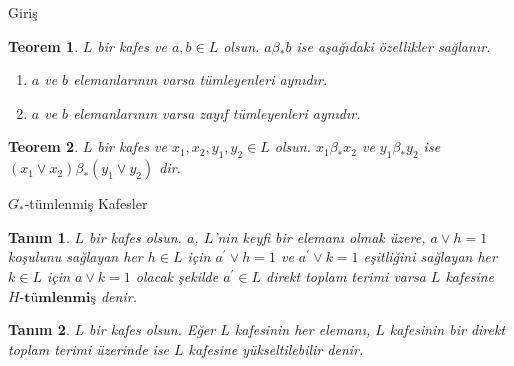 \documentclass[mathserif]{beamer}
\newtheorem*{teorem}{Teorem}
\newtheorem*{tanim}{Tanım}
\begin{document}
\begin{frame}{Giriş}
\begin{teorem}
    $ L $ bir kafes ve $ a,b \in L $ olsun. $ a \beta_* b $ ise aşağıdaki özellikler sağlanır.
    \begin{enumerate}
      \item $ a $ ve $ b $ elemanlarının varsa tümleyenleri aynıdır.
      \item $ a $ ve $ b $ elemanlarının varsa zayıf tümleyenleri aynıdır.
    \end{enumerate}
\end{teorem}
\begin{teorem}
  $ L $ bir kafes ve $ x_1, x_2,y_1,y_2 \in L $ olsun. $ x_1 \beta_* x_2 $ ve $ y_1 \beta_* y_2 $ ise 
  $ ( x_1 \vee x_2 ) \beta_* ( y_1 \vee y_2 ) $ dir.
\end{teorem}
\end{frame}














\begin{frame}{$ G_* $-tümlenmiş Kafesler}
  \begin{tanim}
    $ L $ bir kafes olsun. $ a $, $ L $'nin keyfi bir elemanı olmak üzere,
    $ a \vee h = 1 $ koşulunu sağlayan her $ h \in L $ için $ a^{'} \vee h = 1 $ ve $ a^{'} \vee k = 1 $ 
    eşitliğini sağlayan her $ k \in L $ için $ a \vee k = 1 $ olacak şekilde $ a^{'} \in L $ direkt toplam terimi varsa 
    $ L $ kafesine  \boldmath $ H \textbf{-tümlenmiş} $ \unboldmath denir.


  \end{tanim}
  \begin{tanim}
    $ L $ bir kafes olsun. Eğer $ L $ kafesinin her elemanı, $ L $ kafesinin bir direkt toplam terimi üzerinde ise
    $ L $ kafesine yükseltilebilir denir.

  \end{tanim}
\end{frame}
\end{document}
